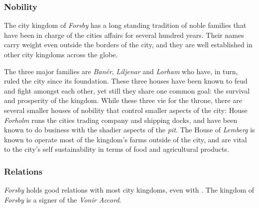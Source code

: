 \subsubsection{Nobility}

The city kingdom of \emph{Forsby} has a long standing tradition of noble
families that have been in charge of the cities affairs for several hundred
years. Their names carry weight even outside the borders of the city, and
they are well established in other city kingdoms across the globe.

The three major families are \emph{Banér}, \emph{Liljenar} and \emph{Lorham}
who have, in turn, ruled the city since its foundation. These three houses
have been known to feud and fight amongst each other, yet still they share one
common goal: the survival and prosperity of the kingdom. While these three vie
for the throne, there are several smaller houses of nobility that control
smaller aspects of the city: House \emph{Forholm} runs the cities trading
company and shipping docks, and have been known to do business with the
shadier aspects of the \emph{pit}. The House of \emph{Lemberg} is known to
operate most of the kingdom's farms outside of the city, and are vital to the
city's self sustainability in terms of food and agricultural products.

\subsubsection{Relations}

\emph{Forsby} holds good relations with most city kingdoms, even with
. The kingdom of \emph{Forsby} is a signer of the
\emph{Vonir Accord}.
